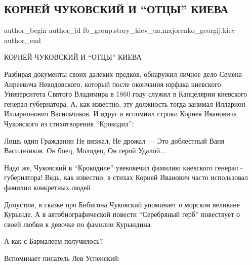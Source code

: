  
 
 
 
 
 
\subsection{КОРНЕЙ ЧУКОВСКИЙ И \enquote{ОТЦЫ} КИЕВА}
\label{sec:15_02_2022.fb.fb_group.story_kiev_ua.2.kornej_chukovskij}
 
\ifcmt
 author_begin
   author_id fb_group.story_kiev_ua,majorenko_georgij.kiev
 author_end
\fi

КОРНЕЙ ЧУКОВСКИЙ И \enquote{ОТЦЫ} КИЕВА

Разбирая документы своих далеких предков, обнаружил личное дело Семена
Анреевича Неводовского, который после окончания юрфака киевского Университета
Святого Владимира в 1860 году служил в Канцелярии киевского
генерал-губернатора. А, как известно, эту должность тогда занимал Илларион
Илларионович Васильчиков. И вдруг я вспомнил строки Корнея Ивановича Чуковского
из стихотворения \enquote{Крокодил}:

\obeycr
Лишь один
Гражданин
Не визжал,
Не дрожал —
Это доблестный Ваня Васильчиков.
Он боец,
Молодец,
Он герой
Удалой...
\restorecr

Надо же, Чуковский в \enquote{Крокодиле} увековечил фамилию киевского генерал -
губернатора! Ведь, как известно, в стихах Корней Иванович часто использовал
фамилии конкретных людей.


Допустим, в сказке про Бибигона Чуковский упоминает о морском великане Курынде.
А в автобиографической повести \enquote{Серебряный герб} повествует о своей любви к
девочке по фамилии Курындина.


А как с Бармалеем получилось?

Вспоминает писатель Лев Успенский:

